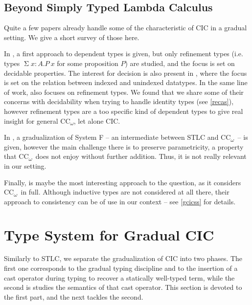 \documentclass{kaobook}
\renewcommand{\S}{\operatorname{\Sigma}}
\DeclareMathOperator{\?}{?}
\newcommand{\coc}{CC\textsubscript{$\omega$}}
\begin{document}
{\subsection{Beyond Simply Typed Lambda Calculus}
\label{interm}

Quite a few papers already handle some of the characteristic of CIC in a gradual setting. We give a short survey of those here.

In \cite{Tanter2015}, a first approach to dependent types is given, but only refinement types (i.e. types $\S x : A. P~x$ for some proposition $P$) are studied, and the focus is set on decidable properties. The interest for decision is also present in \cite{Dagand2018}, where the focus is set on the relation between indexed and unindexed datatypes. In the same line of work, \cite{Lehmann2017} also focuses on refinement types. We found that we share some of their concerns with decidability when trying to handle identity types (see \autoref{recas}), however refinement types are a too specific kind of dependent types to give real insight for general \coc, let alone CIC.

In \cite{Toro2019}, a gradualization of System F – an intermediate between STLC and \coc\ – is given, however the main challenge there is to preserve parametricity, a property that \coc\ does not enjoy without further addition. Thus, it is not really relevant in our setting.

Finally, \cite{Eremondi2019} is maybe the most interesting approach to the question, as it considers \coc\ in full. Although inductive types are not considered at all there, their approach to consistency can be of use in our context – see \autoref{gcicss} for details.


\section{Type System for Gradual CIC}
\label{gcic}

Similarly to STLC, we separate the gradualization of CIC into two phases. The first one corresponds to the gradual typing discipline and to the insertion of a cast operator during typing to recover a statically well-typed term, while the second is studies the semantics of that cast operator. This section is devoted to the first part, and the next tackles the second.

}
\end{document}
